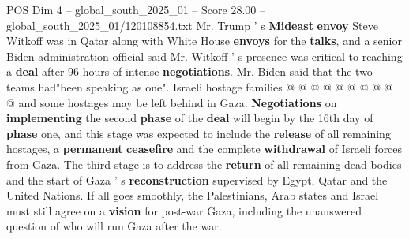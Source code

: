 \begin{textsample}{POS Dim 4 – global\_south\_2025\_01 – Score 28.00 – global\_south\_2025\_01/120108854.txt}
Mr.
Trump ' s \textbf{Mideast} \textbf{envoy} Steve Witkoff was in Qatar along with White House \textbf{envoys} for the \textbf{talks}, and a senior Biden administration official said Mr.
Witkoff ' s presence was critical to reaching a \textbf{deal} after 96 hours of intense \textbf{negotiations}.
Mr.
Biden said that the two teams had"been speaking as one".
Israeli hostage families @ @ @ @ @ @ @ @ @ @ and some hostages may be left behind in Gaza. \textbf{Negotiations} on \textbf{implementing} the second \textbf{phase} of the \textbf{deal} will begin by the 16th day of \textbf{phase} one, and this stage was expected to include the \textbf{release} of all remaining hostages, a \textbf{permanent} \textbf{ceasefire} and the complete \textbf{withdrawal} of Israeli forces from Gaza.
The third stage is to address the \textbf{return} of all remaining dead bodies and the start of Gaza ' s \textbf{reconstruction} supervised by Egypt, Qatar and the United Nations.
If all goes smoothly, the Palestinians, Arab states and Israel must still agree on a \textbf{vision} for post-war Gaza, including the unanswered question of who will run Gaza after the war.

\end{textsample}
